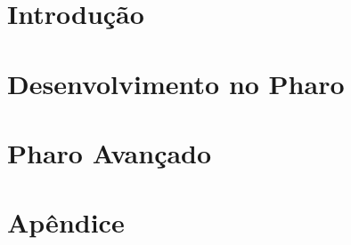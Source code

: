 \documentclass[a4paper,10pt,twoside]{book}
\begin{document}
\part{Introdução}




\part{Desenvolvimento no Pharo}








\part{Pharo Avançado}


\appendix
\part{Apêndice}



{\small\raggedright\printindex}
\pagestyle{empty}
\cleardoublepage
~ %
\cleardoublepage
~ %
\cleardoublepage
\end{document}
